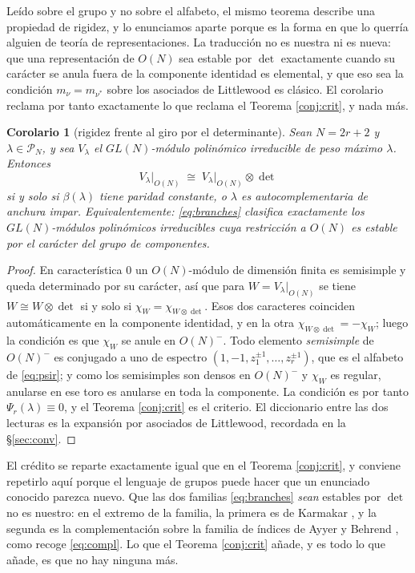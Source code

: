 \documentclass[11pt,reqno]{amsart}
\theoremstyle{plain}
\newtheorem{corollary}[theorem]{Corolario}
\theoremstyle{definition}
\newcommand{\PP}{\mathcal{P}}
\begin{document}
Leído sobre el grupo y no sobre el alfabeto, el mismo teorema describe una propiedad de rigidez, y lo
enunciamos aparte porque es la forma en que lo querría alguien de teoría de representaciones. La
traducción no es nuestra ni es nueva: que una representación de $O(N)$ sea estable por $\det$
exactamente cuando su carácter se anula fuera de la componente identidad es elemental, y que eso sea
la condición $m_\nu=m_{\nu^{*}}$ sobre los asociados de Littlewood \cite{Lit50} es clásico. El
corolario reclama por tanto exactamente lo que reclama el Teorema \ref{conj:crit}, y nada más.

\begin{corollary}[rigidez frente al giro por el determinante]\label{cor:dettwist}
Sean $N=2r+2$ y $\lambda\in\PP_N$, y sea $V_\lambda$ el $GL(N)$-módulo polinómico irreducible de peso
máximo $\lambda$. Entonces
\[
V_\lambda\big|_{O(N)}\;\cong\;V_\lambda\big|_{O(N)}\otimes\det
\]
si y solo si $\beta(\lambda)$ tiene paridad constante, o $\lambda$ es autocomplementaria de anchura
impar. Equivalentemente: \eqref{eq:branches} clasifica exactamente los $GL(N)$-módulos polinómicos
irreducibles cuya restricción a $O(N)$ es estable por el carácter del grupo de componentes.
\end{corollary}

\begin{proof}
En característica $0$ un $O(N)$-módulo de dimensión finita es semisimple y queda determinado por su
carácter, así que para $W=V_\lambda|_{O(N)}$ se tiene $W\cong W\otimes\det$ si y solo si
$\chi_W=\chi_{W\otimes\det}$. Esos dos caracteres coinciden automáticamente en la componente
identidad, y en la otra $\chi_{W\otimes\det}=-\chi_W$; luego la condición es que $\chi_W$ se anule en
$O(N)^{-}$. Todo elemento \emph{semisimple} de $O(N)^{-}$ es conjugado a uno de espectro
$(1,-1,z_1^{\pm1},\dots,z_r^{\pm1})$, que es el alfabeto de \eqref{eq:psir}; y como los semisimples
son densos en $O(N)^{-}$ y $\chi_W$ es regular, anularse en ese toro es anularse en toda la
componente. La condición es por tanto $\Psi_r(\lambda)\equiv0$, y el Teorema \ref{conj:crit} es el
criterio. El diccionario entre las dos lecturas es la expansión por asociados de Littlewood, recordada
en la \S\ref{sec:conv}.
\end{proof}

\noindent El crédito se reparte exactamente igual que en el Teorema \ref{conj:crit}, y conviene
repetirlo aquí porque el lenguaje de grupos puede hacer que un enunciado conocido parezca nuevo. Que
las dos familias \eqref{eq:branches} \emph{sean} estables por $\det$ no es nuestro: en el extremo de
la familia, la primera es de Karmakar \cite[Teorema 4.1(A)]{Kar24}, y la segunda es la complementación
sobre la familia de índices de Ayyer y Behrend \cite{AB19}, como recoge \eqref{eq:compl}. Lo que el
Teorema \ref{conj:crit} añade, y es todo lo que añade, es que no hay ninguna más.
\end{document}
